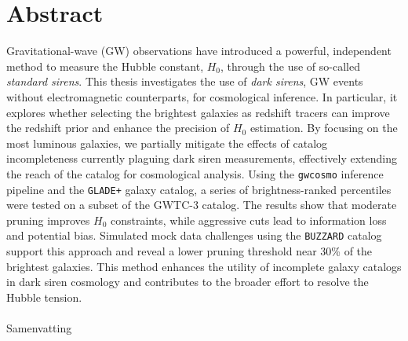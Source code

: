 %
\chapter*{Abstract}
\label{sec:abstract}
\vspace*{-13mm}
Gravitational-wave (GW) observations have introduced a powerful, independent method to measure the Hubble constant, $H_0$, through the use of so-called \textit{standard sirens}. This thesis investigates the use of \textit{dark sirens}, GW events without electromagnetic counterparts, for cosmological inference. In particular, it explores whether selecting the brightest galaxies as redshift tracers can improve the redshift prior and enhance the precision of $H_0$ estimation. By focusing on the most luminous galaxies, we partially mitigate the effects of catalog incompleteness currently plaguing dark siren measurements, effectively extending the reach of the catalog for cosmological analysis. Using the \texttt{gwcosmo} inference pipeline and the \texttt{GLADE+} galaxy catalog, a series of brightness-ranked percentiles were tested on a subset of the GWTC-3 catalog. The results show that moderate pruning improves $H_0$ constraints, while aggressive cuts lead to information loss and potential bias. Simulated mock data challenges using the \texttt{BUZZARD} catalog support this approach and reveal a lower pruning threshold near 30\% of the brightest galaxies. This method enhances the utility of incomplete galaxy catalogs in dark siren cosmology and contributes to the broader effort to resolve the Hubble tension.\\
\\

{ Samenvatting}\label{sec:abstract-nl}\\

